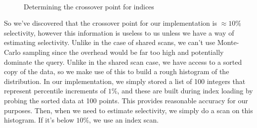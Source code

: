 \documentclass[a4paper, 12pt]{article}
\begin{document}
 \begin{figure}[ht]
     \begin{center}
        ~
        \caption{Determining the crossover point for indices}
        \label{fig:index}
     \end{center}
 \end{figure}

 \medskip
So we've discovered that the crossover point for our implementation is $\approx 10\%$ selectivity, however this information is useless to us unless we have a way of estimating selectivity. Unlike in the case of shared scans, we can't use Monte-Carlo sampling since the overhead would be far too high and potentially dominate the query. Unlike in the shared scan case, we have access to a sorted copy of the data, so we make use of this to build a rough histogram of the distribution. In our implementation, we simply stored a list of 100 integers that represent percentile increments of $1\%$, and these are built during index loading by probing the sorted data at 100 points. This provides reasonable accuracy for our purposes. Then, when we need to estimate selectivity, we simply do a scan on this histogram. If it's below $10\%$, we use an index scan. 
\end{document}
